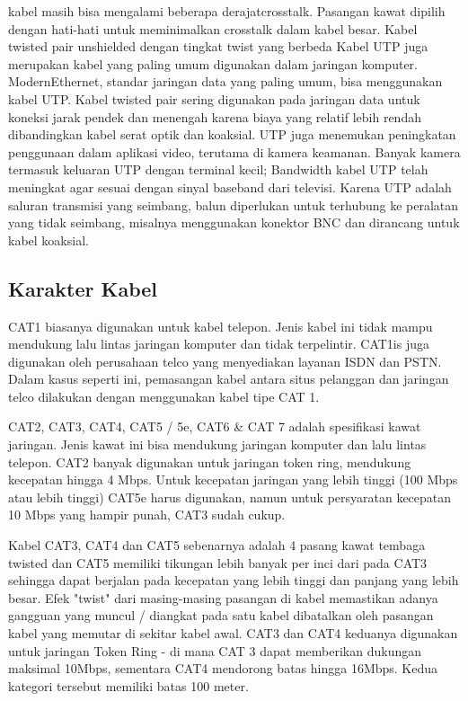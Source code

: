 kabel masih bisa mengalami beberapa derajatcrosstalk. Pasangan kawat dipilih dengan hati-hati untuk meminimalkan crosstalk dalam kabel besar. Kabel 
twisted pair unshielded dengan tingkat twist yang berbeda Kabel UTP juga merupakan kabel yang paling umum digunakan dalam jaringan komputer. ModernEthernet, 
standar jaringan data yang paling umum, bisa menggunakan kabel UTP. Kabel twisted pair sering digunakan pada jaringan data untuk koneksi jarak pendek dan 
menengah karena biaya yang relatif lebih rendah dibandingkan kabel serat optik dan koaksial. UTP juga menemukan peningkatan penggunaan dalam aplikasi video, 
terutama di kamera keamanan. Banyak kamera termasuk keluaran UTP dengan terminal kecil; Bandwidth kabel UTP telah meningkat agar sesuai dengan sinyal baseband 
dari televisi. Karena UTP adalah saluran transmisi yang seimbang, balun diperlukan untuk terhubung ke peralatan yang tidak seimbang, misalnya menggunakan 
konektor BNC dan dirancang untuk kabel koaksial.

\subsection {Karakter Kabel}
CAT1 biasanya digunakan untuk kabel telepon. Jenis kabel ini tidak mampu mendukung lalu lintas jaringan komputer dan tidak terpelintir. CAT1is juga digunakan 
oleh perusahaan telco yang menyediakan layanan ISDN dan PSTN. Dalam kasus seperti ini, pemasangan kabel antara situs pelanggan dan jaringan telco dilakukan 
dengan menggunakan kabel tipe CAT 1.

CAT2, CAT3, CAT4, CAT5 / 5e, CAT6 & CAT 7 adalah spesifikasi kawat jaringan. Jenis kawat ini bisa mendukung jaringan komputer dan lalu lintas telepon. CAT2 
banyak digunakan untuk jaringan token ring, mendukung kecepatan hingga 4 Mbps. Untuk kecepatan jaringan yang lebih tinggi (100 Mbps atau lebih tinggi) CAT5e 
harus digunakan, namun untuk persyaratan kecepatan 10 Mbps yang hampir punah, CAT3 sudah cukup.

Kabel CAT3, CAT4 dan CAT5 sebenarnya adalah 4 pasang kawat tembaga twisted dan CAT5 memiliki tikungan lebih banyak per inci dari pada CAT3 sehingga dapat 
berjalan pada kecepatan yang lebih tinggi dan panjang yang lebih besar. Efek "twist" dari masing-masing pasangan di kabel memastikan adanya gangguan yang 
muncul / diangkat pada satu kabel dibatalkan oleh pasangan kabel yang memutar di sekitar kabel awal. CAT3 dan CAT4 keduanya digunakan untuk jaringan Token 
Ring - di mana CAT 3 dapat memberikan dukungan maksimal 10Mbps, sementara CAT4 mendorong batas hingga 16Mbps. Kedua kategori tersebut memiliki batas 100 meter.

